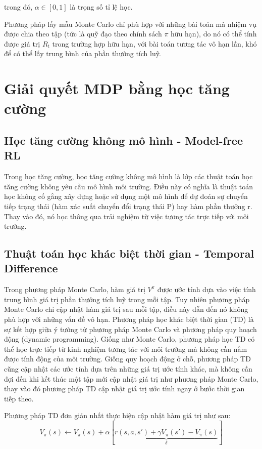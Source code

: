 \documentclass{uetgraduation}
\begin{document}
trong đó, $\alpha \in [0, 1]$ là trọng số tỉ lệ học.

Phương pháp lấy mẫu Monte Carlo chỉ phù hợp với những bài toán mà nhiệm vụ được chia theo tập (tức là quỹ đạo theo chính sách $\pi$ hữu hạn), do nó có thể tính
được giá trị $R_t$ trong trường hợp hữu hạn, với bài toán tương tác vô hạn lần, khó để có thể lấy trung bình của phần thưởng tích luỹ.

\section{Giải quyết MDP bằng học tăng cường}
\subsection{Học tăng cường không mô hình - Model-free RL}
Trong học tăng cường, học tăng cường không mô hình là lớp các thuật toán học tăng cường không yêu cầu mô hình môi trường. Điều này có nghĩa là thuật toán học
không cố gắng xây dựng hoặc sử dụng một mô hình để dự đoán sự chuyển tiếp trạng thái (hàm xác suất chuyển đổi trạng thái P) hay hàm phần thưởng r. Thay vào đó, nó học thông
qua trải nghiệm từ việc tương tác trực tiếp với môi trường.

\subsection{Thuật toán học khác biệt thời gian - Temporal Difference}
Trong phương pháp Monte Carlo, hàm giá trị $V^\pi$ được ước tính dựa vào việc tính trung bình giá trị phần thưởng tích luỹ trong mỗi tập. Tuy nhiên phương pháp Monte Carlo chỉ cập nhật
hàm giá trị sau mỗi tập, điều này dẫn đến nó không phù hợp với những vấn đề vô hạn. Phương pháp học khác biệt thời gian (TD) là sự kết hợp giữa ý tưởng từ phương pháp Monte Carlo và
phương pháp quy hoạch động (dynamic programming). Giống như Monte Carlo, phương pháp học TD có thể học trực tiếp từ kinh nghiệm tương tác với môi trường mà không cần nắm được tính
động của môi trường. Giống quy hoạch động ở chỗ, phương pháp TD cũng cập nhật các ước tính dựa trên những giá trị ước tính khác, mà không cần đợi đến khi kết thúc một tập mới cập
nhật giá trị như phương pháp Monte Carlo, thay vào đó phương pháp TD cập nhật giá trị ước tính ngay ở bước thời gian tiếp theo.

Phương pháp TD đơn giản nhất thực hiện cập nhật hàm giá trị như sau:
\begin{equation}
    V_\pi (s) \leftarrow V_\pi (s) + \alpha [\underbrace{r(s, a, s') + \gamma V_\pi (s') - V_\pi (s)}_\delta]
\end{equation}
\end{document}
